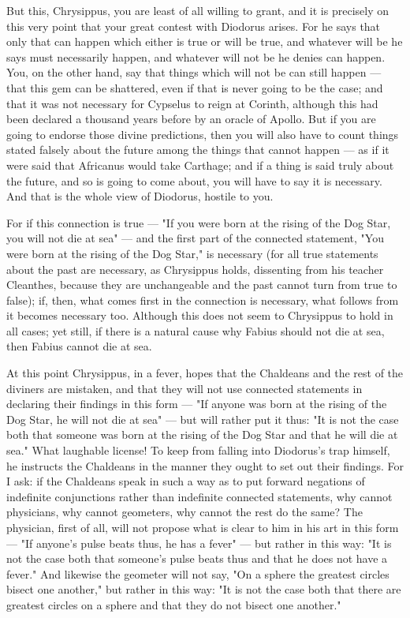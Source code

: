  But this, Chrysippus, you are least of all willing to grant, and it is precisely on this very point that your great contest with Diodorus arises. For he says that only that can happen which either is true or will be true, and whatever will be he says must necessarily happen, and whatever will not be he denies can happen. You, on the other hand, say that things which will not be can still happen — that this gem can be shattered, even if that is never going to be the case; and that it was not necessary for Cypselus to reign at Corinth, although this had been declared a thousand years before by an oracle of Apollo. But if you are going to endorse those divine predictions, then you will also have to count things stated falsely about the future among the things that cannot happen — as if it were said that Africanus would take Carthage; and if a thing is said truly about the future, and so is going to come about, you will have to say it is necessary. And that is the whole view of Diodorus, hostile to you.

 For if this connection is true — "If you were born at the rising of the Dog Star, you will not die at sea" — and the first part of the connected statement, "You were born at the rising of the Dog Star," is necessary (for all true statements about the past are necessary, as Chrysippus holds, dissenting from his teacher Cleanthes, because they are unchangeable and the past cannot turn from true to false); if, then, what comes first in the connection is necessary, what follows from it becomes necessary too. Although this does not seem to Chrysippus to hold in all cases; yet still, if there is a natural cause why Fabius should not die at sea, then Fabius cannot die at sea.

 At this point Chrysippus, in a fever, hopes that the Chaldeans and the rest of the diviners are mistaken, and that they will not use connected statements in declaring their findings in this form — "If anyone was born at the rising of the Dog Star, he will not die at sea" — but will rather put it thus: "It is not the case both that someone was born at the rising of the Dog Star and that he will die at sea." What laughable license! To keep from falling into Diodorus's trap himself, he instructs the Chaldeans in the manner they ought to set out their findings. For I ask: if the Chaldeans speak in such a way as to put forward negations of indefinite conjunctions rather than indefinite connected statements, why cannot physicians, why cannot geometers, why cannot the rest do the same? The physician, first of all, will not propose what is clear to him in his art in this form — "If anyone's pulse beats thus, he has a fever" — but rather in this way: "It is not the case both that someone's pulse beats thus and that he does not have a fever." And likewise the geometer will not say, "On a sphere the greatest circles bisect one another," but rather in this way: "It is not the case both that there are greatest circles on a sphere and that they do not bisect one another."

